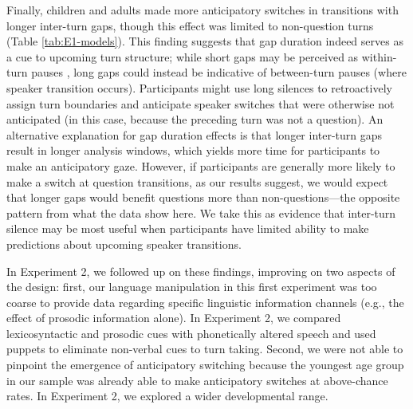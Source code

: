 \documentclass[authoryear, 12pt]{elsarticle}
\begin{document}
Finally, children and adults made more anticipatory switches in transitions with longer inter-turn gaps, though this effect was limited to non-question turns (Table \ref{tab:E1-models}). This finding suggests that gap duration indeed serves as a cue to upcoming turn structure; while short gaps may be perceived as within-turn pauses \citep{mannel2009}, long gaps could instead be indicative of between-turn pauses (where speaker transition occurs). Participants might use long silences to retroactively assign turn boundaries and anticipate speaker switches that were otherwise not anticipated (in this case, because the preceding turn was not a question). An alternative explanation for gap duration effects is that longer inter-turn gaps result in longer analysis windows, which yields more time for participants to make an anticipatory gaze. However, if participants are generally more likely to make a switch at question transitions, as our results suggest, we would expect that longer gaps would benefit questions more than non-questions---the opposite pattern from what the data show here. We take this as evidence that inter-turn silence may be most useful when participants have limited ability to make predictions about upcoming speaker transitions.

In Experiment 2, we followed up on these findings, improving on two aspects of the design: first, our language manipulation in this first experiment was too coarse to provide data regarding specific linguistic information channels (e.g., the effect of prosodic information alone). In Experiment 2, we compared lexicosyntactic and prosodic cues with phonetically altered speech and used puppets to eliminate non-verbal cues to turn taking. Second, we were not able to pinpoint the emergence of anticipatory switching because the youngest age group in our sample was already able to make anticipatory switches at above-chance rates. In Experiment 2, we explored a wider developmental range. 

\end{document}
